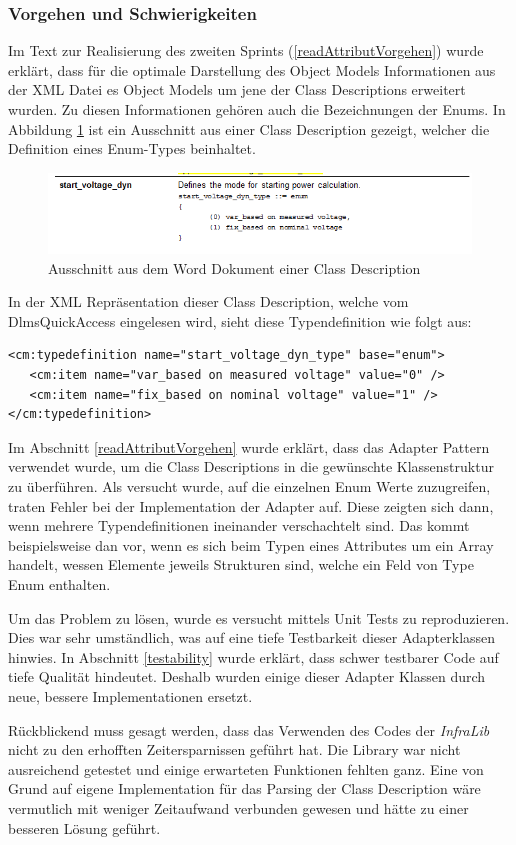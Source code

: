 \subsubsection{Vorgehen und Schwierigkeiten}
Im Text zur Realisierung des zweiten Sprints (\ref{readAttributVorgehen}) wurde erklärt, dass für die optimale Darstellung des Object Models Informationen aus der XML Datei es Object Models um jene der Class Descriptions erweitert wurden.
Zu diesen Informationen gehören auch die Bezeichnungen der Enums.
In Abbildung \ref{fig:enumTypedefword} ist ein Ausschnitt aus einer Class Description gezeigt, welcher die Definition eines Enum-Types beinhaltet.
\begin{figure}
   \centering
   \includegraphics[width=1.0\textwidth]{gfx/enum_typedef_word.png}
   \caption{
      Ausschnitt aus dem Word Dokument einer Class Description
      }
      \label{fig:enumTypedefword}
\end{figure}
In der XML Repräsentation dieser Class Description, welche vom DlmsQuickAccess eingelesen wird, sieht diese Typendefinition wie folgt aus:
\begin{verbatim}
<cm:typedefinition name="start_voltage_dyn_type" base="enum">
   <cm:item name="var_based on measured voltage" value="0" />
   <cm:item name="fix_based on nominal voltage" value="1" />
</cm:typedefinition>
\end{verbatim}

Im Abschnitt \ref{readAttributVorgehen} wurde erklärt, dass das Adapter Pattern verwendet wurde, um die Class Descriptions in die gewünschte Klassenstruktur zu überführen.
Als versucht wurde, auf die einzelnen Enum Werte zuzugreifen, traten Fehler bei der Implementation der Adapter auf.
Diese zeigten sich dann, wenn mehrere Typendefinitionen ineinander verschachtelt sind.
Das kommt beispielsweise dan vor, wenn es sich beim Typen eines Attributes um ein Array handelt, wessen Elemente jeweils Strukturen sind, welche ein Feld von Type Enum enthalten.

Um das Problem zu lösen, wurde es versucht mittels Unit Tests zu reproduzieren.
Dies war sehr umständlich, was auf eine tiefe Testbarkeit dieser Adapterklassen hinwies.
In Abschnitt \ref{testability} wurde erklärt, dass schwer testbarer Code auf tiefe Qualität hindeutet.
Deshalb wurden einige dieser Adapter Klassen durch neue, bessere Implementationen ersetzt.

Rückblickend muss gesagt werden, dass das Verwenden des Codes der \textit{InfraLib} nicht zu den erhofften Zeitersparnissen geführt hat.
Die Library war nicht ausreichend getestet und einige erwarteten Funktionen fehlten ganz.
Eine von Grund auf eigene Implementation für das Parsing der Class Description wäre vermutlich mit weniger Zeitaufwand verbunden gewesen und hätte zu einer besseren Lösung geführt.

